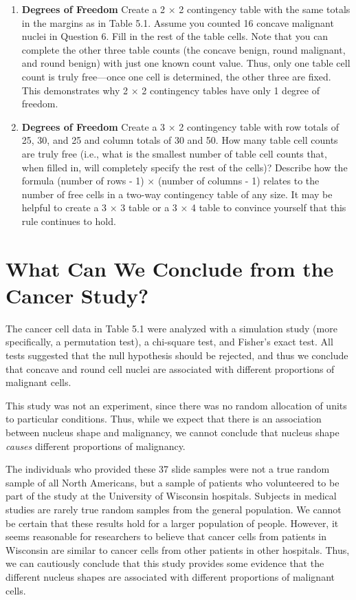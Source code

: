 \documentclass[
]{book}
\begin{document}
\begin{enumerate}
\def\labelenumi{\arabic{enumi}.}
\setcounter{enumi}{19}
\item
  \textbf{Degrees of Freedom} Create a 2 × 2 contingency table with the same totals in the margins as in Table 5.1. Assume you counted 16 concave malignant nuclei in Question 6. Fill in the rest of the table cells. Note that you can complete the other three table counts (the concave benign, round malignant, and round benign) with just one known count value. Thus, only one table cell count is truly free---once one cell is determined, the other three are fixed. This demonstrates why 2 × 2 contingency tables have only 1 degree of freedom.
\item
  \textbf{Degrees of Freedom} Create a 3 × 2 contingency table with row totals of 25, 30, and 25 and column totals of 30 and 50. How many table cell counts are truly free (i.e., what is the smallest number of table cell counts that, when filled in, will completely specify the rest of the cells)? Describe how the formula (number of rows - 1) × (number of columns - 1) relates to the number of free cells in a two-way contingency table of any size. It may be helpful to create a 3 × 3 table or a 3 × 4 table to convince yourself that this rule continues to hold.
\end{enumerate}

\hypertarget{what-can-we-conclude-from-the-cancer-study}{%
\section{What Can We Conclude from the Cancer Study?}\label{what-can-we-conclude-from-the-cancer-study}}

The cancer cell data in Table 5.1 were analyzed with a simulation study (more specifically, a permutation test), a chi-square test, and Fisher's exact test. All tests suggested that the null hypothesis should be rejected, and thus we conclude that concave and round cell nuclei are associated with different proportions of malignant cells.

This study was not an experiment, since there was no random allocation of units to particular conditions. Thus, while we expect that there is an association between nucleus shape and malignancy, we cannot conclude that nucleus shape \emph{causes} different proportions of malignancy.

The individuals who provided these 37 slide samples were not a true random sample of all North Americans, but a sample of patients who volunteered to be part of the study at the University of Wisconsin hospitals. Subjects in medical studies are rarely true random samples from the general population. We cannot be certain that these results hold for a larger population of people. However, it seems reasonable for researchers to believe that cancer cells from patients in Wisconsin are similar to cancer cells from other patients in other hospitals. Thus, we can cautiously conclude that this study provides some evidence that the different nucleus shapes are associated with different proportions of malignant cells.
\end{document}
